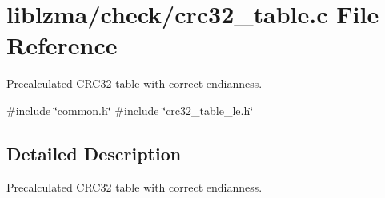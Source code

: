 \section{liblzma/check/crc32\+\_\+table.c File Reference}
\label{crc32__table_8c}


Precalculated C\+R\+C32 table with correct endianness.  


{\ttfamily \#include \char`\"{}common.\+h\char`\"{}}\newline
{\ttfamily \#include \char`\"{}crc32\+\_\+table\+\_\+le.\+h\char`\"{}}\newline


\subsection{Detailed Description}
Precalculated C\+R\+C32 table with correct endianness. 

